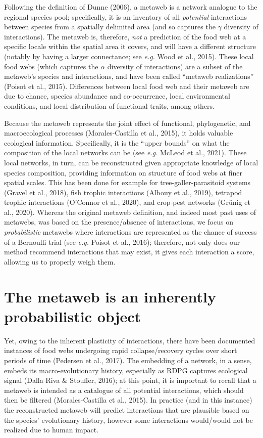 \documentclass[10pt,oneside]{article}
\begin{document}
Following the definition of Dunne (2006), a metaweb is a network
analogue to the regional species pool; specifically, it is an inventory
of all \emph{potential} interactions between species from a spatially
delimited area (and so captures the \(\gamma\) diversity of
interactions). The metaweb is, therefore, \emph{not} a prediction of the
food web at a specific locale within the spatial area it covers, and
will have a different structure (notably by having a larger connectance;
see \emph{e.g.} Wood et al., 2015). These local food webs (which
captures the \(\alpha\) diversity of interactions) are a subset of the
metaweb's species and interactions, and have been called ``metaweb
realizations'' (Poisot et al., 2015). Differences between local food web
and their metaweb are due to chance, species abundance and
co-occurrence, local environmental conditions, and local distribution of
functional traits, among others.

Because the metaweb represents the joint effect of functional,
phylogenetic, and macroecological processes (Morales-Castilla et al.,
2015), it holds valuable ecological information. Specifically, it is the
``upper bounds'' on what the composition of the local networks can be
(see \emph{e.g.} McLeod et al., 2021). These local networks, in turn,
can be reconstructed given appropriate knowledge of local species
composition, providing information on structure of food webs at finer
spatial scales. This has been done for example for
tree-galler-parasitoid systems (Gravel et al., 2018), fish trophic
interactions (Albouy et al., 2019), tetrapod trophic interactions
(O'Connor et al., 2020), and crop-pest networks (Grünig et al., 2020).
Whereas the original metaweb definition, and indeed most past uses of
metawebs, was based on the presence/absence of interactions, we focus on
\emph{probabilistic} metawebs where interactions are represented as the
chance of success of a Bernoulli trial (see \emph{e.g.} Poisot et al.,
2016); therefore, not only does our method recommend interactions that
may exist, it gives each interaction a score, allowing us to properly
weigh them.

\hypertarget{the-metaweb-is-an-inherently-probabilistic-object}{%
\section{The metaweb is an inherently probabilistic
object}\label{the-metaweb-is-an-inherently-probabilistic-object}}

Yet, owing to the inherent plasticity of interactions, there have been
documented instances of food webs undergoing rapid collapse/recovery
cycles over short periods of time (Pedersen et al., 2017). The embedding
of a network, in a sense, embeds its macro-evolutionary history,
especially as RDPG captures ecological signal (Dalla Riva \& Stouffer,
2016); at this point, it is important to recall that a metaweb is
intended as a catalogue of all potential interactions, which should then
be filtered (Morales-Castilla et al., 2015). In practice (and in this
instance) the reconstructed metaweb will predict interactions that are
plausible based on the species' evolutionary history, however some
interactions would/would not be realized due to human impact.
\end{document}

